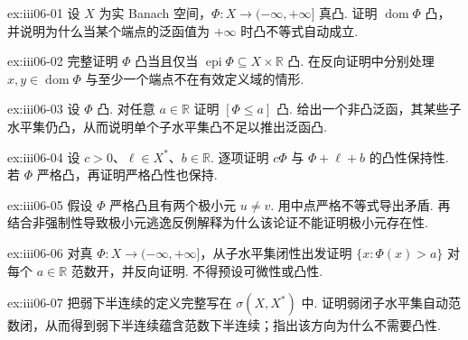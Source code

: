 \begin{FAExercise}[有效定义域与凸性]{ex:iii06-01}
设 \(\displaystyle X\) 为实 Banach 空间，\(\displaystyle\Phi:X\to(-\infty,+\infty]\) 真凸. 证明 \(\displaystyle\operatorname{dom}\Phi\) 凸，并说明为什么当某个端点的泛函值为 \(\displaystyle+\infty\) 时凸不等式自动成立.
\end{FAExercise}

\begin{FAExercise}[上图判据]{ex:iii06-02}
完整证明 \(\displaystyle\Phi\) 凸当且仅当 \(\displaystyle\operatorname{epi}\Phi\subseteq X\times\mathbb R\) 凸. 在反向证明中分别处理 \(\displaystyle x,y\in\operatorname{dom}\Phi\) 与至少一个端点不在有效定义域的情形.
\end{FAExercise}

\begin{FAExercise}[子水平集凸性]{ex:iii06-03}
设 \(\displaystyle\Phi\) 凸. 对任意 \(\displaystyle a\in\mathbb R\) 证明 \(\displaystyle[\Phi\leqslant a]\) 凸. 给出一个非凸泛函，其某些子水平集仍凸，从而说明单个子水平集凸不足以推出泛函凸.
\end{FAExercise}

\begin{FAExercise}[正倍数缩放与仿射扰动]{ex:iii06-04}
设 \(\displaystyle c>0\)、\(\displaystyle\ell\in X^*\)、\(\displaystyle b\in\mathbb R\). 逐项证明 \(\displaystyle c\Phi\) 与 \(\displaystyle\Phi+\ell+b\) 的凸性保持性. 若 \(\displaystyle\Phi\) 严格凸，再证明严格凸性也保持.
\end{FAExercise}

\begin{FAExercise}[严格凸性的存在时唯一性]{ex:iii06-05}
假设 \(\displaystyle\Phi\) 严格凸且有两个极小元 \(\displaystyle u\neq v\). 用中点严格不等式导出矛盾. 再结合非强制性导致极小元逃逸反例解释为什么该论证不能证明极小元存在性.
\end{FAExercise}

\begin{FAExercise}[范数下半连续的子水平集定义]{ex:iii06-06}
对真 \(\displaystyle\Phi:X\to(-\infty,+\infty]\)，从子水平集闭性出发证明 \(\displaystyle\{x:\Phi(x)>a\}\) 对每个 \(\displaystyle a\in\mathbb R\) 范数开，并反向证明. 不得预设可微性或凸性.
\end{FAExercise}

\begin{FAExercise}[弱下半连续与拓扑命名]{ex:iii06-07}
把弱下半连续的定义完整写在 \(\displaystyle\sigma(X,X^*)\) 中. 证明弱闭子水平集自动范数闭，从而得到弱下半连续蕴含范数下半连续；指出该方向为什么不需要凸性.
\end{FAExercise}

